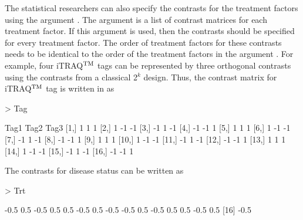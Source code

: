 \documentclass[article]{jss}
\begin{document}
The statistical researchers can also specify the contrasts for the treatment factors using the argument . The argument  is a list of contrast matrices for each treatment factor. If this argument is used, then the contrasts should be specified for every treatment factor. The order of treatment factors for these contrasts needs to be identical to the order of the treatment factors in the argument . For example, four iTRAQ$^{\rm TM}$ tags can be represented by three orthogonal contrasts using the contrasts from a classical 2$^k$ design. Thus, the contrast matrix for iTRAQ$^{\rm TM}$ tag is written in  as
\begin{CodeChunk}
\begin{CodeInput}
> Tag
\end{CodeInput}
\begin{CodeOutput}
      Tag1 Tag2 Tag3
 [1,]    1    1    1
 [2,]    1   -1   -1
 [3,]   -1    1   -1
 [4,]   -1   -1    1
 [5,]    1    1    1
 [6,]    1   -1   -1
 [7,]   -1    1   -1
 [8,]   -1   -1    1
 [9,]    1    1    1
[10,]    1   -1   -1
[11,]   -1    1   -1
[12,]   -1   -1    1
[13,]    1    1    1
[14,]    1   -1   -1
[15,]   -1    1   -1
[16,]   -1   -1    1
\end{CodeOutput}
\end{CodeChunk}
The contrasts for disease status can be written as
\begin{CodeChunk}
\begin{CodeInput}
> Trt
\end{CodeInput}
\begin{CodeOutput}
 [1] -0.5  0.5 -0.5  0.5  0.5 -0.5  0.5 -0.5 -0.5  0.5 -0.5  0.5  0.5 -0.5  0.5
[16] -0.5
\end{CodeOutput}
\end{CodeChunk}
\end{document}
